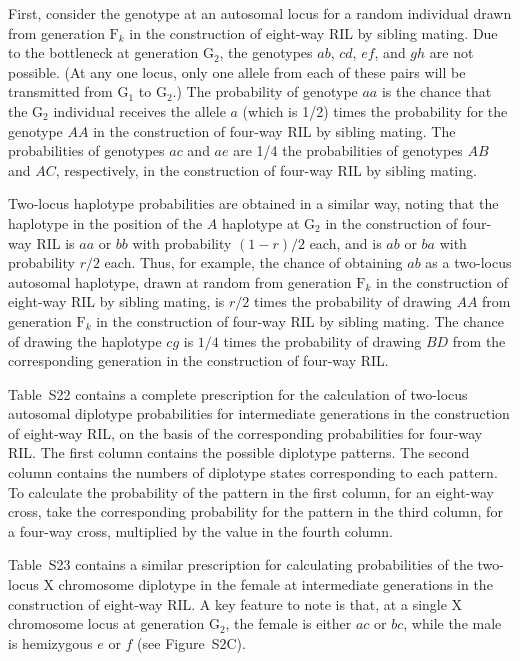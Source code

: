 \documentclass[12pt,letterpaper]{article}
\begin{document}
First, consider the genotype at an autosomal locus for a random
individual drawn from generation $\text{F}_k$ in the construction of
eight-way RIL by sibling mating.  Due to the bottleneck at generation
$\text{G}_2$, the genotypes $ab$, $cd$, $ef$, and $gh$ are not
possible.  (At any one locus, only one allele from each of these pairs
will be transmitted from $\text{G}_1$ to $\text{G}_2$.)  The
probability of genotype $aa$ is the chance that the $\text{G}_2$
individual receives the allele $a$ (which is 1/2) times the probability for the
genotype $AA$ in the construction of four-way RIL by sibling mating.
The probabilities of genotypes $ac$ and $ae$ are 1/4 the probabilities
of genotypes $AB$ and $AC$, respectively, in the construction of
four-way RIL by sibling mating.

Two-locus haplotype probabilities are obtained in a similar way,
noting that the haplotype in the position of the $A$ haplotype at
$\text{G}_2$ in the construction of four-way RIL is $aa$ or $bb$ with
probability $(1-r)/2$ each, and is $ab$ or $ba$ with probability $r/2$
each.  Thus, for example, the chance of obtaining $ab$ as a two-locus autosomal
haplotype, drawn at random from generation $\text{F}_k$ in the
construction of eight-way RIL by sibling mating, is $r/2$ times the
probability of drawing $AA$ from generation $\text{F}_k$ in the
construction of four-way RIL by sibling mating.  The chance of drawing
the haplotype $cg$ is $1/4$ times the probability of drawing $BD$ from the
corresponding generation in the construction of four-way RIL.

Table~S22 contains a complete prescription for the
calculation of two-locus autosomal diplotype probabilities for
intermediate generations in the construction of eight-way RIL, on the
basis of the corresponding probabilities for four-way RIL.  The first
column contains the possible diplotype patterns.  The second column
contains the numbers of diplotype states corresponding to each
pattern.  To calculate the probability of the pattern in the first
column, for an eight-way cross, take the corresponding probability
for the pattern in the third column, for a four-way cross, multiplied
by the value in the fourth column.

Table~S23 contains a similar prescription for calculating
probabilities of the two-locus X chromosome diplotype in the female at
intermediate generations in the construction of eight-way RIL.  A key
feature to note is that, at a single X chromosome locus at generation
$\text{G}_2$, the female is either $ac$ or $bc$, while the male is
hemizygous $e$ or $f$ (see Figure~S2C).
\end{document}

